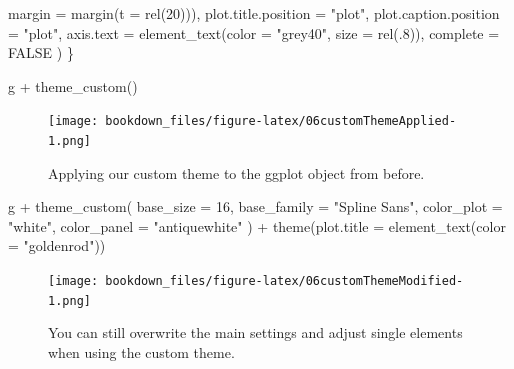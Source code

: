 \documentclass[
]{krantz}
\makeatletter
\newenvironment{Shaded}{\begin{snugshade}}{\end{snugshade}}
\newcommand{\AttributeTok}[1]{\textcolor[rgb]{0.61,0.61,0.61}{#1}}
\newcommand{\ConstantTok}[1]{\textcolor[rgb]{0,0,0}{#1}}
\newcommand{\DecValTok}[1]{\textcolor[rgb]{0.06,0.06,0.06}{#1}}
\newcommand{\FunctionTok}[1]{\textcolor[rgb]{0,0,0}{#1}}
\newcommand{\NormalTok}[1]{#1}
\newcommand{\SpecialCharTok}[1]{\textcolor[rgb]{0,0,0}{#1}}
\newcommand{\StringTok}[1]{\textcolor[rgb]{0.5,0.5,0.5}{#1}}
\newenvironment{kframe}{%
\medskip{}
\setlength{\fboxsep}{.8em}
 \def\at@end@of@kframe{}%
 \ifinner\ifhmode%
  \def\at@end@of@kframe{\end{minipage}}%
  \begin{minipage}{\columnwidth}%
 \fi\fi%
 \def\FrameCommand##1{\hskip\@totalleftmargin \hskip-\fboxsep
 \colorbox{shadecolor}{##1}\hskip-\fboxsep
     \hskip-\linewidth \hskip-\@totalleftmargin \hskip\columnwidth}%
 \MakeFramed {\advance\hsize-\width
   \@totalleftmargin\z@ \linewidth\hsize
   \@setminipage}}%
 {\par\unskip\endMakeFramed%
 \at@end@of@kframe}
\renewenvironment{Shaded}{\begin{kframe}}{\end{kframe}}
\makeatother
\begin{document}
\begin{Shaded}
\begin{Highlighting}[]
                                  \AttributeTok{margin =} \FunctionTok{margin}\NormalTok{(}\AttributeTok{t =} \FunctionTok{rel}\NormalTok{(}\DecValTok{20}\NormalTok{))),}
      \AttributeTok{plot.title.position =} \StringTok{"plot"}\NormalTok{,}
      \AttributeTok{plot.caption.position =} \StringTok{"plot"}\NormalTok{,}
      \AttributeTok{axis.text =} \FunctionTok{element\_text}\NormalTok{(}\AttributeTok{color =} \StringTok{"grey40"}\NormalTok{, }\AttributeTok{size =} \FunctionTok{rel}\NormalTok{(.}\DecValTok{8}\NormalTok{)),}
      \AttributeTok{complete =} \ConstantTok{FALSE}
\NormalTok{  )}
\NormalTok{\}}
\end{Highlighting}
\end{Shaded}

\begin{Shaded}
\begin{Highlighting}[]
\NormalTok{g }\SpecialCharTok{+} \FunctionTok{theme\_custom}\NormalTok{()}
\end{Highlighting}
\end{Shaded}

\begin{figure}
\centering
\texttt{[image: bookdown\_files/figure-latex/06customThemeApplied-1.png]}
\caption{\label{fig:06customThemeApplied}Applying our custom theme to the ggplot object from before.}
\end{figure}

\begin{Shaded}
\begin{Highlighting}[]
\NormalTok{g }\SpecialCharTok{+}
  \FunctionTok{theme\_custom}\NormalTok{(}
    \AttributeTok{base\_size =} \DecValTok{16}\NormalTok{, }\AttributeTok{base\_family =} \StringTok{"Spline Sans"}\NormalTok{,}
    \AttributeTok{color\_plot =} \StringTok{"white"}\NormalTok{, }\AttributeTok{color\_panel =} \StringTok{"antiquewhite"}
\NormalTok{  ) }\SpecialCharTok{+}
  \FunctionTok{theme}\NormalTok{(}\AttributeTok{plot.title =} \FunctionTok{element\_text}\NormalTok{(}\AttributeTok{color =} \StringTok{"goldenrod"}\NormalTok{))}
\end{Highlighting}
\end{Shaded}

\begin{figure}
\centering
\texttt{[image: bookdown\_files/figure-latex/06customThemeModified-1.png]}
\caption{\label{fig:06customThemeModified}You can still overwrite the main settings and adjust single elements when using the custom theme.}
\end{figure}
\end{document}
